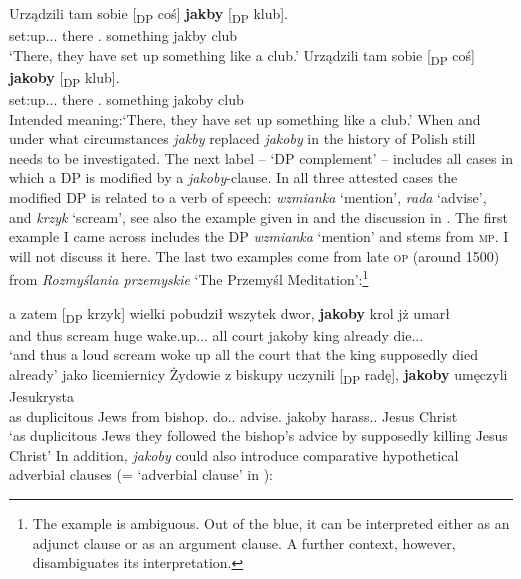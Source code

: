 \documentclass[output=paper
,modfonts
,nonflat]{langsci/langscibook}
\begin{document}
\ea \ea \gll	Urządzili tam sobie [\textsubscript{DP} coś] \textbf{jakby} \hspace{1,0cm} [\textsubscript{DP} klub]. \\
		set:up.{\lptcp}.{\vir}.{\thirdperson}{\pl} there {}.{\dat} {} something jakby {} {} club \\
	\glt	`There, they have set up something like a club.' 
	\ex\gll		*Urządzili tam sobie [\textsubscript{DP} coś] \textbf{jakoby} \hspace{1,0cm} [\textsubscript{DP} klub]. \\
            set:up.{\lptcp}.{\vir}.{\thirdperson}{\pl} there {}.{\dat} {} something jakoby {} {} club \\
	\glt	Intended meaning:`There, they have set up something like a club.'
    \z\z
When and under what circumstances \emph{jakby} replaced \emph{jakoby} in the history of Polish still needs to be investigated.
The next label – `DP complement' – includes all cases in which a DP is modified by a \emph{jakoby}-clause. In all three attested cases the modified DP is related to a verb of speech: \emph{wzmianka} `mention', \emph{rada} `advise', and \emph{krzyk} `scream', see also the example given in  and the discussion in . The first example I came across includes the DP \emph{wzmianka} `mention' and stems from \textsc{mp}. I will not discuss it here. The last two examples come from late \textsc{op} (around 1500) from \emph{Rozmyślania przemyskie} `The Przemyśl Meditation':\footnote{The example  is ambiguous. Out of the blue, it can be interpreted either as an adjunct clause or as an argument clause. A further context, however, disambiguates its interpretation.}

\ea \ea \gll	a zatem [\textsubscript{DP} krzyk] wielki pobudził wszytek dwor, \textbf{jakoby} krol jż umarł \label{adjunct_argument} \\
		and thus {} scream huge wake.up.{\lptcp}.{\sg}.{\masc} all court jakoby king already die.{\lptcp}.{\sg}.{\masc} \\
	\glt	`and thus a loud scream woke up all the court that  the king supposedly died already' 
	\ex\gll		jako licemiernicy Żydowie z biskupy uczynili \hspace{1,0cm} [\textsubscript{DP} radę], \textbf{jakoby} umęczyli Jesukrysta \\
            as duplicitous Jews from bishop.{\gen} do.{\lptcp}.{\vir} {} {} advise.{\acc} jakoby harass.{\lptcp}.{\vir} {Jesus Christ} \\
	\glt	 `as duplicitous Jews they followed the bishop's advice by supposedly killing Jesus Christ'  
    \z\z
In addition, \emph{jakoby} could also introduce comparative hypothetical \linebreak adverbial clauses (= `adverbial clause' in ):
\end{document}
